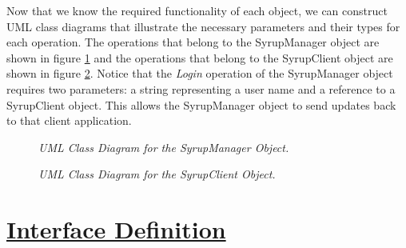 Now that we know the required functionality of each object, we can construct 
UML class diagrams that illustrate the necessary parameters and their types for 
each operation.  The operations that belong to the SyrupManager object are 
shown in figure \ref{SyrupManagerClassDiagram} and the operations that belong 
to the SyrupClient object are shown in figure \ref{SyrupClientClassDiagram}.   
Notice that the {\em{Login}} operation of the SyrupManager object requires two 
parameters: a string representing a user name and a reference to a SyrupClient 
object.  This allows the SyrupManager object to send updates back to that 
client application.
\begin{figure}
\begin{center}
\leavevmode
\caption{\em{UML Class Diagram for the SyrupManager Object}.}
\figline
         \label{SyrupManagerClassDiagram}
\end{center}
\end{figure}
\begin{figure}
\begin{center}
\leavevmode
\caption{\em{UML Class Diagram for the SyrupClient Object}.}
\figline
         \label{SyrupClientClassDiagram}
\end{center}
\end{figure}


\section*{\underline{Interface Definition}} 

